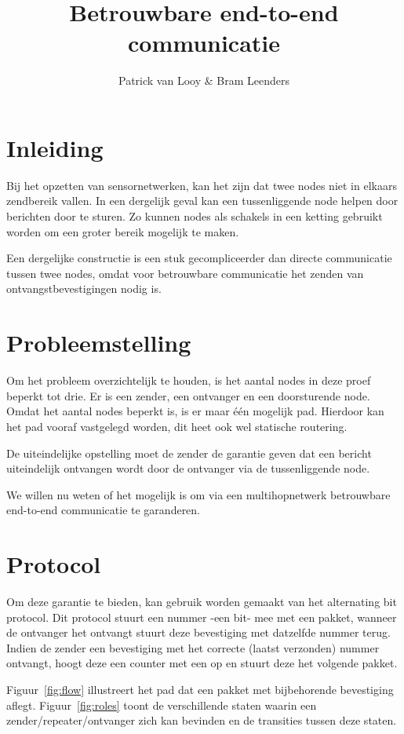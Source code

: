 \documentclass[a4paper,10pt]{article}
\title{Betrouwbare end-to-end communicatie}
\author{Patrick van Looy \& Bram Leenders}
\begin{document}
\maketitle

\section{Inleiding}
Bij het opzetten van sensornetwerken, kan het zijn dat twee nodes niet in elkaars zendbereik vallen. In een dergelijk geval kan een tussenliggende node helpen door berichten door te sturen. Zo kunnen nodes als schakels in een ketting gebruikt worden om een groter bereik mogelijk te maken.

Een dergelijke constructie is een stuk gecompliceerder dan directe communicatie tussen twee nodes, omdat voor betrouwbare communicatie het zenden van ontvangstbevestigingen nodig is.

\section{Probleemstelling}
Om het probleem overzichtelijk te houden, is het aantal nodes in deze proef beperkt tot drie. Er is een zender, een ontvanger en een doorsturende node. Omdat het aantal nodes beperkt is, is er maar \'e\'en mogelijk pad. Hierdoor kan het pad vooraf vastgelegd worden, dit heet ook wel statische routering.

De uiteindelijke opstelling moet de zender de garantie geven dat een bericht uiteindelijk ontvangen wordt door de ontvanger via de tussenliggende node.

We willen nu weten of het mogelijk is om via een multihopnetwerk betrouwbare end-to-end communicatie te garanderen.

\section{Protocol}
Om deze garantie te bieden, kan gebruik worden gemaakt van het alternating bit protocol. Dit protocol stuurt een nummer -een bit- mee met een pakket, wanneer de ontvanger het ontvangt stuurt deze bevestiging met datzelfde nummer terug. Indien de zender een bevestiging met het correcte (laatst verzonden) nummer ontvangt, hoogt deze een counter met een op en stuurt deze het volgende pakket.

Figuur~\ref{fig:flow} illustreert het pad dat een pakket met bijbehorende bevestiging aflegt. Figuur~\ref{fig:roles} toont de verschillende staten waarin een zender/repeater/ontvanger zich kan bevinden en de transities tussen deze staten.
\end{document}
